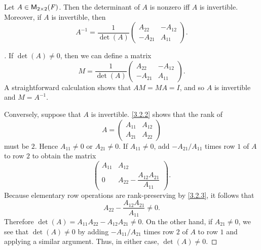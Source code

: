 \begin{thm}\label{4.2}
  Let \(A \in \ms[2][2][\F]\).
  Then the determinant of \(A\) is nonzero iff \(A\) is invertible.
  Moreover, if \(A\) is invertible, then
  \[
    A^{-1} = \dfrac{1}{\det(A)} \begin{pmatrix}
      A_{2 2}  & -A_{1 2} \\
      -A_{2 1} & A_{1 1}
    \end{pmatrix}.
  \]
\end{thm}

\begin{proof}[]
  If \(\det(A) \neq 0\), then we can define a matrix
  \[
    M = \dfrac{1}{\det(A)} \begin{pmatrix}
      A_{2 2}  & -A_{1 2} \\
      -A_{2 1} & A_{1 1}
    \end{pmatrix}.
  \]
  A straightforward calculation shows that \(AM = MA = I\), and so \(A\) is invertible and \(M = A^{-1}\).

  Conversely, suppose that \(A\) is invertible.
  \cref{3.2.2} shows that the rank of
  \[
    A = \begin{pmatrix}
      A_{1 1} & A_{1 2} \\
      A_{2 1} & A_{2 2}
    \end{pmatrix}
  \]
  must be \(2\).
  Hence \(A_{1 1} \neq 0\) or \(A_{2 1} \neq 0\).
  If \(A_{1 1} \neq 0\), add \(-A_{2 1} / A_{1 1}\) times row \(1\) of \(A\) to row \(2\) to obtain the matrix
  \[
    \begin{pmatrix}
      A_{1 1} & A_{1 2}                                    \\
      0       & A_{2 2} - \dfrac{A_{1 2} A_{2 1}}{A_{1 1}}
    \end{pmatrix}.
  \]
  Because elementary row operations are rank-preserving by \cref{3.2.3}, it follows that
  \[
    A_{2 2} - \dfrac{A_{1 2} A_{2 1}}{A_{1 1}} \neq 0.
  \]
  Therefore \(\det(A) = A_{1 1} A_{2 2} - A_{1 2} A_{2 1} \neq 0\).
  On the other hand, if \(A_{2 1} \neq 0\), we see that \(\det(A) \neq 0\) by adding \(-A_{1 1} / A_{2 1}\) times row \(2\) of \(A\) to row \(1\) and applying a similar argument.
  Thus, in either case, \(\det(A) \neq 0\).
\end{proof}

